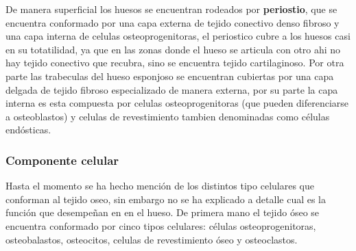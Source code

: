 \documentclass[letterpaper,12pt,oneside]{book}
\begin{document}
    De manera superficial los huesos se encuentran rodeados por \textbf{periostio}, que se encuentra conformado por una capa externa de tejido conectivo denso fibroso y una capa interna de celulas osteoprogenitoras, el periostico cubre a los huesos casi en su totatilidad, ya que en las zonas donde el hueso se articula con otro ahi no hay tejido conectivo que recubra, sino se encuentra tejido cartilaginoso. Por otra parte las trabeculas del hueso esponjoso se encuentran cubiertas por una capa delgada de tejido fibroso especializado de manera externa, por su parte la capa interna es esta compuesta por celulas osteoprogenitoras (que pueden diferenciarse a osteoblastos) y celulas de revestimiento tambien denominadas como células endósticas.


    \subsubsection{Componente celular}

    Hasta el momento se ha hecho mención de los distintos tipo celulares que conforman al tejido oseo, sin embargo no se ha explicado a detalle cual es la función que desempeñan en en el hueso. De primera mano el tejido óseo se encuentra conformado por cinco tipos celulares: células osteoprogenitoras, osteobalastos, osteocitos, celulas de revestimiento óseo y osteoclastos.

    \vspace{10pt}
\end{document}
